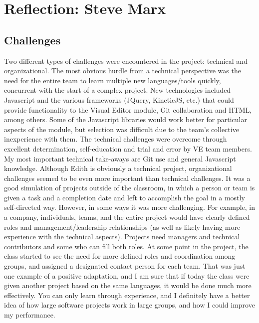 \documentclass[a4paper]{article}
\begin{document}
\section{Reflection: Steve Marx}
\subsection{Challenges}
Two different types of challenges were encountered in the project: technical and organizational. The most obvious hurdle from a technical perspective was the need for the entire team to learn multiple new languages/tools quickly, concurrent with the start of a complex project. New technologies included Javascript and the various frameworks (JQuery, KineticJS, etc.) that could provide functionality to the Visual Editor module, Git collaboration and HTML, among others. Some of the Javascript libraries would work better for particular aspects of the module, but selection was difficult due to the team's collective inexperience with them. The technical challenges were overcome through excellent determination, self-education and trial and error by VE team members. My most important technical take-aways are Git use and general Javascript knowledge.
Although Edith is obviously a technical project, organizational challenges seemed to be even more important than technical challenges. It was a good simulation of projects outside of the classroom, in which a person or team is given a task and a completion date and left to accomplish the goal in a mostly self-directed way. However, in some ways it was more challenging. For example, in a company, individuals, teams, and the entire project would have clearly defined roles and management/leadership relationships (as well as likely having more experience with the technical aspects). Projects need managers and technical contributors and some who can fill both roles. At some point in the project, the class started to see the need for more defined roles and coordination among groups, and assigned a designated contact person for each team. That was just one example of a positive adaptation, and I am sure that if today the class were given another project based on the same languages, it would be done much more effectively. You can only learn through experience, and I definitely have a better idea of how large software projects work in large groups, and how I could improve my performance.
\end{document}
